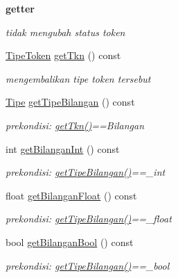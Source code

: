 \begin{Indent}{\bf getter}\par
{\em tidak mengubah status token }\begin{DoxyCompactItemize}
\item 
\hyperlink{_token_8h_a29ea73031d51befacf649fa6af865e30}{Tipe\-Token} \hyperlink{class_token_a735a4c2ae32ddce6c8ade6d8ab06f02b}{get\-Tkn} () const 
\begin{DoxyCompactList}\small\item\em mengembalikan tipe token tersebut \end{DoxyCompactList}\item 
\hyperlink{_token_8h_a074bf6c0d33845f3d36e457b9243dcfb}{Tipe} \hyperlink{class_token_af25c1d47e7bf11aa08b1c32aa4920769}{get\-Tipe\-Bilangan} () const 
\begin{DoxyCompactList}\small\item\em prekondisi\-: \hyperlink{class_token_a735a4c2ae32ddce6c8ade6d8ab06f02b}{get\-Tkn()}==Bilangan \end{DoxyCompactList}\item 
int \hyperlink{class_token_aeced03b265a97a1b8cfd557f4613192a}{get\-Bilangan\-Int} () const 
\begin{DoxyCompactList}\small\item\em prekondisi\-: \hyperlink{class_token_af25c1d47e7bf11aa08b1c32aa4920769}{get\-Tipe\-Bilangan()}==\-\_\-int \end{DoxyCompactList}\item 
float \hyperlink{class_token_a32f0323896e15112a72b49bed901cd2e}{get\-Bilangan\-Float} () const 
\begin{DoxyCompactList}\small\item\em prekondisi\-: \hyperlink{class_token_af25c1d47e7bf11aa08b1c32aa4920769}{get\-Tipe\-Bilangan()}==\-\_\-float \end{DoxyCompactList}\item 
bool \hyperlink{class_token_a6ff4b84802344ed9336e27590d7d4b51}{get\-Bilangan\-Bool} () const 
\begin{DoxyCompactList}\small\item\em prekondisi\-: \hyperlink{class_token_af25c1d47e7bf11aa08b1c32aa4920769}{get\-Tipe\-Bilangan()}==\-\_\-bool \end{DoxyCompactList}\end{DoxyCompactItemize}
\end{Indent}
